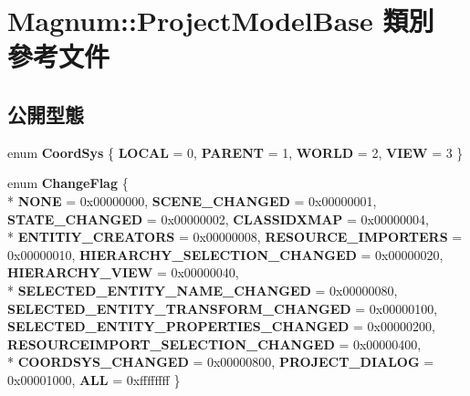 \hypertarget{class_magnum_1_1_project_model_base}{}\section{Magnum\+:\+:Project\+Model\+Base 類別 參考文件}
\label{class_magnum_1_1_project_model_base}
\subsection*{公開型態}
\begin{DoxyCompactItemize}
\item 
enum {\bfseries Coord\+Sys} \{ {\bfseries L\+O\+C\+AL} = 0, 
{\bfseries P\+A\+R\+E\+NT} = 1, 
{\bfseries W\+O\+R\+LD} = 2, 
{\bfseries V\+I\+EW} = 3
 \}\hypertarget{class_magnum_1_1_project_model_base_a7bf06b0c18d27789df63873207385b9a}{}\label{class_magnum_1_1_project_model_base_a7bf06b0c18d27789df63873207385b9a}

\item 
enum {\bfseries Change\+Flag} \{ \\*
{\bfseries N\+O\+NE} = 0x00000000, 
{\bfseries S\+C\+E\+N\+E\+\_\+\+C\+H\+A\+N\+G\+ED} = 0x00000001, 
{\bfseries S\+T\+A\+T\+E\+\_\+\+C\+H\+A\+N\+G\+ED} = 0x00000002, 
{\bfseries C\+L\+A\+S\+S\+I\+D\+X\+M\+AP} = 0x00000004, 
\\*
{\bfseries E\+N\+T\+I\+T\+I\+Y\+\_\+\+C\+R\+E\+A\+T\+O\+RS} = 0x00000008, 
{\bfseries R\+E\+S\+O\+U\+R\+C\+E\+\_\+\+I\+M\+P\+O\+R\+T\+E\+RS} = 0x00000010, 
{\bfseries H\+I\+E\+R\+A\+R\+C\+H\+Y\+\_\+\+S\+E\+L\+E\+C\+T\+I\+O\+N\+\_\+\+C\+H\+A\+N\+G\+ED} = 0x00000020, 
{\bfseries H\+I\+E\+R\+A\+R\+C\+H\+Y\+\_\+\+V\+I\+EW} = 0x00000040, 
\\*
{\bfseries S\+E\+L\+E\+C\+T\+E\+D\+\_\+\+E\+N\+T\+I\+T\+Y\+\_\+\+N\+A\+M\+E\+\_\+\+C\+H\+A\+N\+G\+ED} = 0x00000080, 
{\bfseries S\+E\+L\+E\+C\+T\+E\+D\+\_\+\+E\+N\+T\+I\+T\+Y\+\_\+\+T\+R\+A\+N\+S\+F\+O\+R\+M\+\_\+\+C\+H\+A\+N\+G\+ED} = 0x00000100, 
{\bfseries S\+E\+L\+E\+C\+T\+E\+D\+\_\+\+E\+N\+T\+I\+T\+Y\+\_\+\+P\+R\+O\+P\+E\+R\+T\+I\+E\+S\+\_\+\+C\+H\+A\+N\+G\+ED} = 0x00000200, 
{\bfseries R\+E\+S\+O\+U\+R\+C\+E\+I\+M\+P\+O\+R\+T\+\_\+\+S\+E\+L\+E\+C\+T\+I\+O\+N\+\_\+\+C\+H\+A\+N\+G\+ED} = 0x00000400, 
\\*
{\bfseries C\+O\+O\+R\+D\+S\+Y\+S\+\_\+\+C\+H\+A\+N\+G\+ED} = 0x00000800, 
{\bfseries P\+R\+O\+J\+E\+C\+T\+\_\+\+D\+I\+A\+L\+OG} = 0x00001000, 
{\bfseries A\+LL} = 0xffffffff
 \}\hypertarget{class_magnum_1_1_project_model_base_a6fc78ca583ec2b573e7e4d17ec6b4a3e}{}\label{class_magnum_1_1_project_model_base_a6fc78ca583ec2b573e7e4d17ec6b4a3e}

\end{DoxyCompactItemize}

